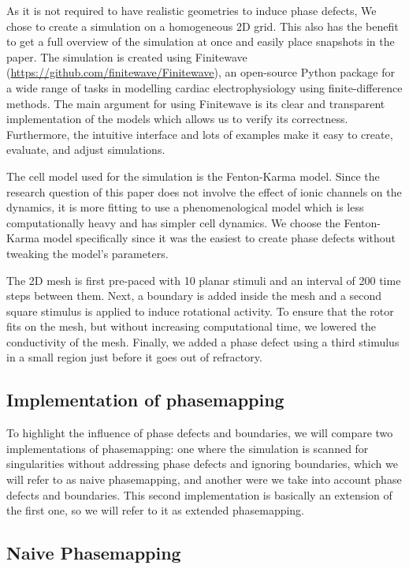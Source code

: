 \documentclass[twocolumn]{article}
\begin{document}
As it is not required to have realistic geometries to induce phase
defects, We chose to create a simulation on a homogeneous 2D grid. This
also has the benefit to get a full overview of the simulation at once
and easily place snapshots in the paper.
The simulation is created using Finitewave
(\url{https://github.com/finitewave/Finitewave}), an open-source Python
package for a wide range of tasks in modelling cardiac electrophysiology
using finite-difference methods. The main argument for using Finitewave
is its clear and transparent implementation of the models which allows
us to verify its correctness. Furthermore, the intuitive interface and
lots of examples make it easy to create, evaluate, and adjust
simulations.

The cell model used for the simulation is the Fenton-Karma model. Since
the research question of this paper does not involve the effect of ionic
channels on the dynamics, it is more fitting to use a phenomenological
model which is less computationally heavy and has simpler cell dynamics.
We choose the Fenton-Karma model specifically since it was the easiest
to create phase defects without tweaking the model's parameters.

The 2D mesh is first pre-paced with 10 planar stimuli and an interval of
200 time steps between them. Next, a boundary is added inside the mesh
and a second square stimulus is applied to induce rotational activity.
To ensure that the rotor fits on the mesh, but without increasing
computational time, we lowered the conductivity of the mesh. Finally, we
added a phase defect using a third stimulus in a small region just
before it goes out of refractory.

\subsection{Implementation of
phasemapping}\label{implementation-of-phasemapping}

To highlight the influence of phase defects and boundaries, we will
compare two implementations of phasemapping: one where the simulation is
scanned for singularities without addressing phase defects and ignoring
boundaries, which we will refer to as naive phasemapping, and another
were we take into account phase defects and boundaries. This second
implementation is basically an extension of the first one, so we will
refer to it as extended phasemapping.

\subsection{Naive Phasemapping}\label{naive-phasemapping}
\end{document}
